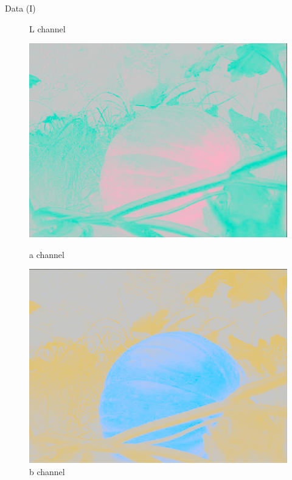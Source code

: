 \documentclass{beamer}
\begin{document}
\begin{frame}{Data (I)}
\begin{figure}[!htb]
      \caption{L channel}
    \endminipage\hfill
      \includegraphics[width=\linewidth]{resources/pumpkin_a.jpg}
      \caption{a channel}
    \endminipage\hfill
      \includegraphics[width=\linewidth]{resources/pumpkin_b.jpg}
      \caption{b channel}
    \endminipage
  \end{figure}
\end{frame}
\end{document}
